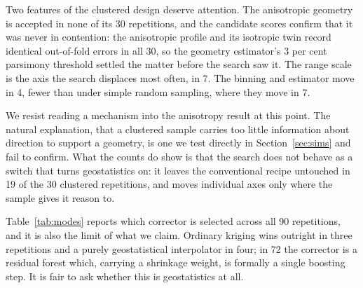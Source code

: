 \documentclass[preprint,12pt,authoryear]{elsarticle}
\begin{document}
\begin{table}[!ht]
\centering
\caption{Repetitions, out of 30 per design, in which the out-of-fold search departs from the conventional recipe on each of the three axes it is recorded against: the binning and estimator (a cutoff at half the maximum distance, 15 lags, the robust estimator), the range scale (a bandwidth of half the practical range), and isotropy. The selected variogram family is not recorded per repetition and so is not counted here.}
\label{tab:axes}
\small
\setlength{\tabcolsep}{2pt}

\end{table}

Two features of the clustered design deserve attention. The anisotropic geometry
is accepted in none of its 30 repetitions, and the candidate scores confirm that
it was never in contention: the anisotropic profile and its isotropic twin
record identical out-of-fold errors in all 30, so the geometry estimator's 3 per
cent parsimony threshold settled the matter before the search saw it. The range
scale is the axis the search displaces most often, in 7. The binning and estimator move in 4, fewer than
under simple random sampling, where they move in 7.

We resist reading a mechanism into the anisotropy result at this point. The
natural explanation, that a clustered sample carries too little information
about direction to support a geometry, is one we test directly in
Section~\ref{sec:sims} and fail to confirm. What the counts do show is that the
search does not behave as a switch that turns geostatistics on: it leaves the
conventional recipe untouched in 19 of the 30 clustered repetitions, and moves
individual axes only where the sample gives it reason to.

Table~\ref{tab:modes} reports which corrector is selected across all 90
repetitions, and it is also the limit of what we claim. Ordinary kriging wins
outright in three repetitions and a purely geostatistical interpolator in four;
in 72 the corrector is a residual forest which, carrying a shrinkage weight, is
formally a single boosting step. It is fair to ask whether this is
geostatistics at all.

\begin{table}[!ht]
\centering
\caption{Selected corrector across all 90 repetitions.}
\label{tab:modes}
\small

\end{table}
\end{document}

